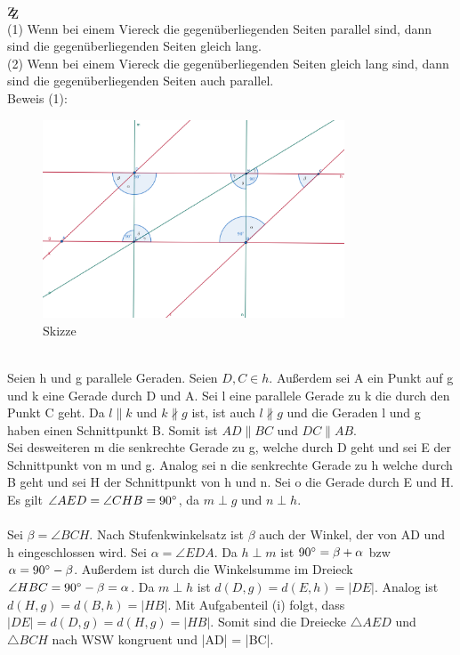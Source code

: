 \documentclass[12pt,a4paper]{article}
\begin{document}
\noindent $\mathrm{Z\kern-.3em\raise-0.5ex\hbox{Z}}$ \\
(1) Wenn bei einem Viereck die gegenüberliegenden Seiten parallel sind, dann sind die gegenüberliegenden Seiten gleich lang.\\
(2) Wenn bei einem Viereck die gegenüberliegenden Seiten gleich lang sind, dann sind die gegenüberliegenden Seiten auch parallel.\\
Beweis (1):\\
\begin{figure}[htbp]
    \centering
    \includegraphics[width=0.8\textwidth]{Blatt_02_Aufgabe_1_ii.png}
    \caption{Skizze}
    \label{fig:mein_bild}
\end{figure} \\
Seien h und g parallele Geraden. Seien $D,C \in h$. Außerdem sei A ein Punkt auf g und k eine Gerade durch D und A. Sei l eine parallele Gerade zu k die durch den Punkt C geht. Da $l \parallel k$ und $k \nparallel g$ ist, ist auch $l \nparallel g$ und die Geraden l und g haben einen Schnittpunkt B. Somit ist $AD \parallel BC$ und $DC \parallel AB$. \\
Sei desweiteren m die senkrechte Gerade zu g, welche durch D geht und sei E der Schnittpunkt von m und g. Analog sei n die senkrechte Gerade zu h welche durch B geht und sei H der Schnittpunkt von h und n. Sei o die Gerade durch E und H.\\
Es gilt $\angle AED = \angle CHB = 90\degree$, da $m \perp g$ und $n \perp h$.\\
\\
Sei $\beta = \angle BCH$. Nach Stufenkwinkelsatz ist $\beta$ auch der Winkel, der von AD und h eingeschlossen wird. Sei $\alpha = \angle EDA$. Da $h \perp m$ ist $90\degree = \beta + \alpha$ bzw $\alpha = 90\degree - \beta$. Außerdem ist durch die Winkelsumme im Dreieck $\angle HBC = 90\degree - \beta = \alpha$. Da $m \perp h$ ist $d(D, g) = d(E, h) = |DE|$. Analog ist $d(H, g) = d(B, h) = |HB|$. Mit Aufgabenteil (i) folgt, dass $|DE| = d(D,g) = d(H, g) = |HB|$. Somit sind die Dreiecke $\triangle AED$ und $\triangle BCH$ nach WSW kongruent und |AD| = |BC|.\\
\newpage
\end{document}
